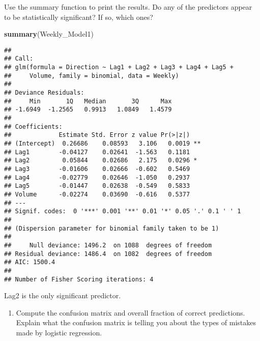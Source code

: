 \documentclass[]{article}
\newenvironment{Shaded}{\begin{snugshade}}{\end{snugshade}}
\newcommand{\KeywordTok}[1]{\textcolor[rgb]{0.13,0.29,0.53}{\textbf{#1}}}
\newcommand{\DataTypeTok}[1]{\textcolor[rgb]{0.13,0.29,0.53}{#1}}
\newcommand{\DecValTok}[1]{\textcolor[rgb]{0.00,0.00,0.81}{#1}}
\newcommand{\FloatTok}[1]{\textcolor[rgb]{0.00,0.00,0.81}{#1}}
\newcommand{\StringTok}[1]{\textcolor[rgb]{0.31,0.60,0.02}{#1}}
\newcommand{\OperatorTok}[1]{\textcolor[rgb]{0.81,0.36,0.00}{\textbf{#1}}}
\newcommand{\NormalTok}[1]{#1}
\providecommand{\tightlist}{%
  \setlength{\itemsep}{0pt}\setlength{\parskip}{0pt}}
\begin{document}
Use the summary function to print the results. Do any of the predictors
appear to be statistically significant? If so, which ones?

\begin{Shaded}
\begin{Highlighting}[]
\KeywordTok{summary}\NormalTok{(Weekly_Model1)}
\end{Highlighting}
\end{Shaded}

\begin{verbatim}
## 
## Call:
## glm(formula = Direction ~ Lag1 + Lag2 + Lag3 + Lag4 + Lag5 + 
##     Volume, family = binomial, data = Weekly)
## 
## Deviance Residuals: 
##     Min       1Q   Median       3Q      Max  
## -1.6949  -1.2565   0.9913   1.0849   1.4579  
## 
## Coefficients:
##             Estimate Std. Error z value Pr(>|z|)   
## (Intercept)  0.26686    0.08593   3.106   0.0019 **
## Lag1        -0.04127    0.02641  -1.563   0.1181   
## Lag2         0.05844    0.02686   2.175   0.0296 * 
## Lag3        -0.01606    0.02666  -0.602   0.5469   
## Lag4        -0.02779    0.02646  -1.050   0.2937   
## Lag5        -0.01447    0.02638  -0.549   0.5833   
## Volume      -0.02274    0.03690  -0.616   0.5377   
## ---
## Signif. codes:  0 '***' 0.001 '**' 0.01 '*' 0.05 '.' 0.1 ' ' 1
## 
## (Dispersion parameter for binomial family taken to be 1)
## 
##     Null deviance: 1496.2  on 1088  degrees of freedom
## Residual deviance: 1486.4  on 1082  degrees of freedom
## AIC: 1500.4
## 
## Number of Fisher Scoring iterations: 4
\end{verbatim}

Lag2 is the only significant predictor.

\begin{enumerate}
\def\labelenumi{(\alph{enumi})}
\setcounter{enumi}{2}
\tightlist
\item
  Compute the confusion matrix and overall fraction of correct
  predictions. Explain what the confusion matrix is telling you about
  the types of mistakes made by logistic regression.
\end{enumerate}

\begin{Shaded}
\end{Shaded}
\end{document}

